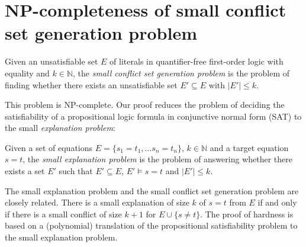 \documentclass[smallextended]{svjour3}
\begin{document}
\section{NP-completeness of small conflict set generation problem}
\label{sec:npcomplete}



\begin{definition}
Given an unsatisfiable set $E$ of literals in quantifier-free first-order logic
with equality and $k \in \mathbb{N}$, the \emph{small conflict set generation
  problem} is the problem of finding whether there exists an unsatisfiable set
$E' \subseteq E$ with $|E'| \leq k$.
\end{definition}
\noindent This problem is NP-complete.  Our proof reduces the problem
of deciding the satisfiability of a propositional logic formula in conjunctive
normal form (SAT) to the small \emph{explanation problem}:
\begin{definition}
Given a set of equations $E = \{ s_1=t_1,\ldots s_n=t_n\}$, $k \in
\mathbb{N}$ and a target equation $s = t$, the \emph{small explanation problem}
is the problem of answering whether there exists a set $E'$ such that $E'
\subseteq E$, $E' \models s = t$ and $|E'| \leq k$.
\end{definition}

\noindent The small explanation problem and the small conflict set generation
problem are closely related.  There is a small explanation of size $k$ of $s=t$
from $E$ if and only if there is a small conflict of size $k+1$ for $E \cup
\{s\neq t\}$.  The proof of hardness is based on a (polynomial) translation of
the propositional satisfiability problem to the small explanation problem.

\newcommand{\Assignment}{{\it Assignment}}
\newcommand{\Clause}{{\it Clause}}
\newcommand{\Connect}{{\it Connect}}
\end{document}
